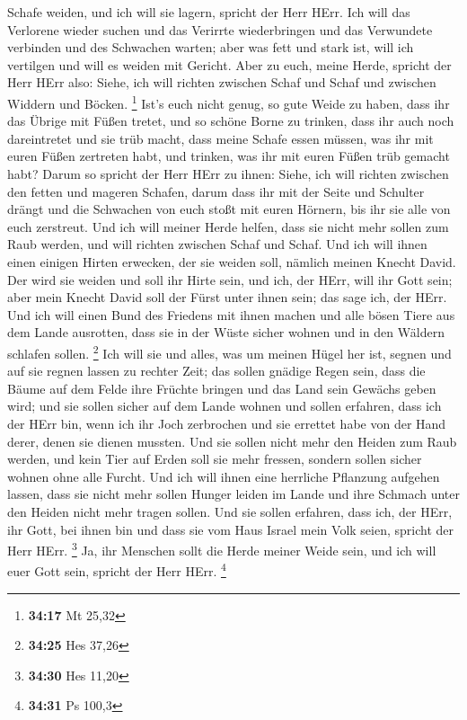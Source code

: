 Schafe weiden, und ich will sie lagern, spricht der Herr HErr.
 Ich will das Verlorene wieder suchen und das Verirrte
wiederbringen und das Verwundete verbinden und des Schwachen warten;
aber was fett und stark ist, will ich vertilgen und will es weiden mit
Gericht.  Aber zu euch, meine Herde, spricht der Herr HErr
also: Siehe, ich will richten zwischen Schaf und Schaf und zwischen
Widdern und Böcken. \footnote{\textbf{34:17} Mt 25,32} 
Ist's euch nicht genug, so gute Weide zu haben, dass ihr das Übrige mit
Füßen tretet, und so schöne Borne zu trinken, dass ihr auch noch
dareintretet und sie trüb macht,  dass meine Schafe essen
müssen, was ihr mit euren Füßen zertreten habt, und trinken, was ihr mit
euren Füßen trüb gemacht habt?  Darum so spricht der Herr
HErr zu ihnen: Siehe, ich will richten zwischen den fetten und mageren
Schafen,  darum dass ihr mit der Seite und Schulter drängt
und die Schwachen von euch stoßt mit euren Hörnern, bis ihr sie alle von
euch zerstreut.  Und ich will meiner Herde helfen, dass sie
nicht mehr sollen zum Raub werden, und will richten zwischen Schaf und
Schaf.  Und ich will ihnen einen einigen Hirten erwecken,
der sie weiden soll, nämlich meinen Knecht David. Der wird sie weiden
und soll ihr Hirte sein,  und ich, der HErr, will ihr Gott
sein; aber mein Knecht David soll der Fürst unter ihnen sein; das sage
ich, der HErr.  Und ich will einen Bund des Friedens mit
ihnen machen und alle bösen Tiere aus dem Lande ausrotten, dass sie in
der Wüste sicher wohnen und in den Wäldern schlafen sollen. \footnote{\textbf{34:25}
  Hes 37,26}  Ich will sie und alles, was um meinen Hügel
her ist, segnen und auf sie regnen lassen zu rechter Zeit; das sollen
gnädige Regen sein,  dass die Bäume auf dem Felde ihre
Früchte bringen und das Land sein Gewächs geben wird; und sie sollen
sicher auf dem Lande wohnen und sollen erfahren, dass ich der HErr bin,
wenn ich ihr Joch zerbrochen und sie errettet habe von der Hand derer,
denen sie dienen mussten.  Und sie sollen nicht mehr den
Heiden zum Raub werden, und kein Tier auf Erden soll sie mehr fressen,
sondern sollen sicher wohnen ohne alle Furcht.  Und ich
will ihnen eine herrliche Pflanzung aufgehen lassen, dass sie nicht mehr
sollen Hunger leiden im Lande und ihre Schmach unter den Heiden nicht
mehr tragen sollen.  Und sie sollen erfahren, dass ich, der
HErr, ihr Gott, bei ihnen bin und dass sie vom Haus Israel mein Volk
seien, spricht der Herr HErr. \footnote{\textbf{34:30} Hes 11,20}
 Ja, ihr Menschen sollt die Herde meiner Weide sein, und
ich will euer Gott sein, spricht der Herr HErr. \footnote{\textbf{34:31}
  Ps 100,3}

